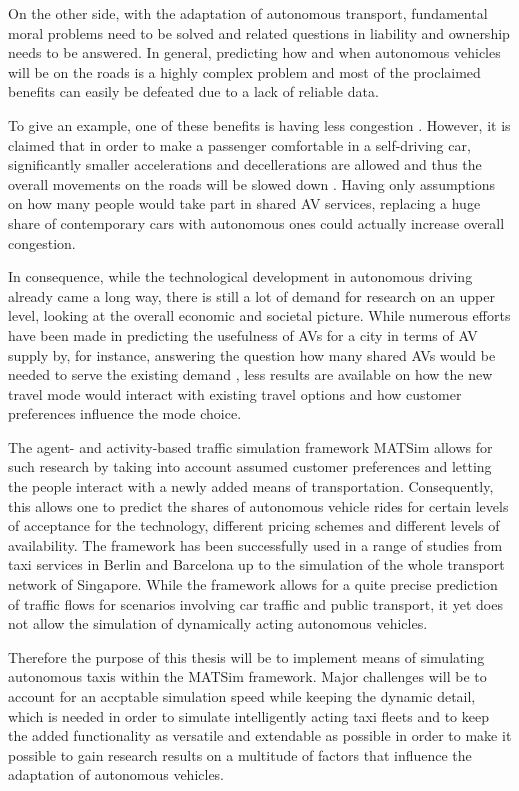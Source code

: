 On the other side, with the adaptation of autonomous transport, fundamental moral
problems  need to be solved and related questions in liability and
ownership needs to be answered. In general, predicting how and when autonomous
vehicles will be on the roads is a highly complex problem and most of the proclaimed
benefits can easily be defeated due to a lack of reliable data.

To give an example, one of these benefits is having less congestion . However,
it is claimed that in order to make a passenger comfortable in a self-driving car,
significantly smaller accelerations and decellerations are allowed and thus the
overall movements on the roads will be slowed down . Having only assumptions
on how many people would take part in shared AV services, replacing a huge share of
contemporary cars with autonomous ones could actually increase overall congestion.

In consequence, while the technological development in autonomous driving already
came a long way, there is still a lot of demand for research on an upper level, looking
at the overall economic and societal picture. While numerous efforts have been made
in predicting the usefulness of AVs for a city in terms of AV supply by, for
instance, answering the question how many shared AVs would be needed to serve the
existing demand , less results are available on how the new travel
mode would interact with existing travel options and how customer preferences
influence the mode choice.

The agent- and activity-based traffic simulation framework MATSim allows for such
research by taking into account assumed customer preferences and letting the people
interact with a newly added means of transportation. Consequently, this allows one
to predict the shares of autonomous vehicle rides for certain levels of acceptance
for the technology, different pricing schemes and different levels of availability.
The framework has been successfully used in a range of studies from taxi services
in Berlin and Barcelona up to the simulation of the whole transport network of
Singapore. While the framework allows for a quite precise prediction of traffic
flows for scenarios involving car traffic and public transport, it yet does not
allow the simulation of dynamically acting autonomous vehicles.

Therefore the purpose of this thesis will be to implement means of simulating autonomous
taxis within the MATSim framework. Major challenges will be to account for an
accptable simulation speed while keeping the dynamic detail, which is needed in
order to simulate intelligently acting taxi fleets and to keep the added functionality
as versatile and extendable as possible in order to make it possible to gain
research results on a multitude of factors that influence the adaptation of
autonomous vehicles.

